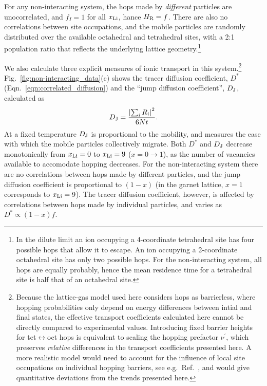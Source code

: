 \documentclass[aps,prb,twocolumn,superscriptaddress,reprint]{revtex4-1}
\newcommand{\xLi}{x_\m{Li}}
\begin{document}
For any non-interacting system, the hops made by \emph{different} particles are unocorrelated, and $f_I=1$ for all $\xLi$, hance $H_{\mathrm{R}}=f$. 
There are also no correlations between site occupations, and the mobile particles are randomly distributed over the available octahedral and tetrahedral sites, with a 2:1 population ratio that reflects the underlying lattice geometry.\footnote{In the dilute limit an ion occupying a 4-coordinate tetrahedral site has four possible hops that allow it to escape. An ion occupying a 2-coordinate octahedral site has only two possible hops. For the non-interacting system, all hops are equally probably, hence the mean residence time for a tetrahedral site is half that of an octahedral site.}

We also calculate three explicit measures of ionic transport in this system.\footnote{Because the lattice-gas model used here considers hops as barrierless, where hopping probabilities only depend on  energy differences between intial and final states, the effective transport coefficients calculated here cannot be directly compared to experimental values. 
Introducing fixed barrier heights for tet$\leftrightarrow$oct hops is equivalent to scaling the hopping prefactor $\nu^\prime$, which preserves \emph{relative} differences in the transport coefficients presented here. 
A more realistic model would need to account for the influence of local site occupations on individual hopping barriers, see e.g.\ Ref.\ \cite{VanderVenAndCeder_HandbookofMaterialsModelling2010}, and would give quantitative deviations from the trends presented here.} Fig.~\ref{fig:non-interacting_data}(c) shows the tracer diffusion coefficient, $D^*$ (Eqn.~\ref{eqn:correlated_diffusion}) and the ``jump diffusion coefficient'', $D_{\mathrm{J}}$,\cite{VanDerVenEtAl_AccChemRes2013} calculated as
\begin{equation}
  D_{\mathrm{J}}=\frac{\left|\sum_iR_i\right|^2}{6Nt}.
\end{equation}
At a fixed temperature $D_{\mathrm{J}}$ is proportional to the mobility, and measures the ease with which the mobile particles collectively migrate. 
Both $D^*$ and $D_{\mathrm{J}}$ decrease monotonically from $\xLi=0$ to $\xLi=9$ ($x=0\to1$), as the number of vacancies available to accomodate hopping decreases. 
For the non-interacting system there are no correlations between hops made by different particles, and the jump diffusion coefficient is proportional to $(1-x)$ (in the garnet lattice, $x=1$ corresponds to $\xLi=9$).\cite{Kutner_PhysLett1981,VanDerVenEtAl_AccChemRes2013}
The tracer diffusion coefficient, however, is affected by correlations between hops made by individual particles, and varies as $D^*\propto(1-x)f$. 
\end{document}
